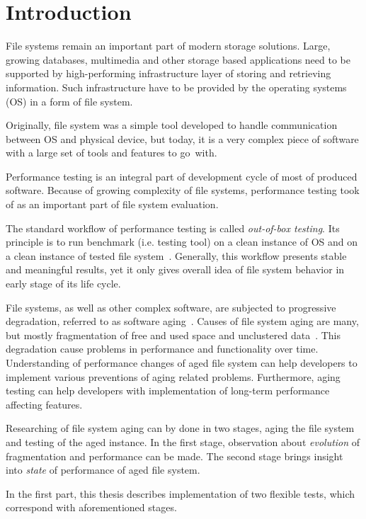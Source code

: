 \documentclass[
  color, %
  table, %
  lof,   %
  lot,   %
]{fithesis3}
\begin{document}
\chapter{Introduction}
File systems remain an important part of modern storage solutions. Large, growing databases, multimedia and other storage based applications need to be supported by high-performing infrastructure layer of storing and retrieving information. Such infrastructure have to be provided by the operating systems (OS) in a form of file system.

Originally, file system was a simple tool developed to handle communication between OS and physical device, but today, it is a very complex piece of software with a large set of tools and features to go~with.

Performance testing is an integral part of development cycle of most of produced software. Because of growing complexity of file systems, performance testing took of as an important part of file system evaluation.

The standard workflow of performance testing is called \emph{out-of-box testing}. Its principle is to run benchmark (i.e. testing tool) on a clean instance of OS and on a clean instance of tested file system~\cite{Traeger:2008:NYS:1367829.1367831}. Generally, this workflow presents stable and meaningful results, yet it only gives overall idea of file system behavior in early stage of its life cycle. 

File systems, as well as other complex software, are subjected to progressive degradation, referred to as software aging~\cite{Cotroneo:2014:SSA:2543749.2539117}. Causes of file system aging are many, but mostly fragmentation of free and used space and unclustered data~\cite{Smith:1997:FSA:258623.258689}. This degradation cause problems in performance and functionality over time. Understanding of performance changes of aged file system can help developers to implement various preventions of aging related problems. Furthermore, aging testing can help developers with implementation of long-term performance affecting features.

Researching of file system aging can by done in two stages, aging the file system and testing of the aged instance. In the first stage, observation about \emph{evolution} of fragmentation and performance can be made. The second stage brings insight into \emph{state} of performance of aged file system.

In the first part, this thesis describes implementation of two flexible tests, which correspond with aforementioned stages.
 
\end{document}
